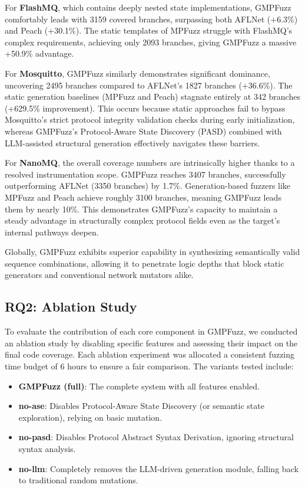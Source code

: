 For \textbf{FlashMQ}, which contains deeply nested state implementations, GMPFuzz comfortably leads with 3159 covered branches, surpassing both AFLNet (+6.3\%) and Peach (+30.1\%). The static templates of MPFuzz struggle with FlashMQ's complex requirements, achieving only 2093 branches, giving GMPFuzz a massive +50.9\% advantage.

For \textbf{Mosquitto}, GMPFuzz similarly demonstrates significant dominance, uncovering 2495 branches compared to AFLNet's 1827 branches (+36.6\%). The static generation baselines (MPFuzz and Peach) stagnate entirely at 342 branches (+629.5\% improvement). This occurs because static approaches fail to bypass Mosquitto's strict protocol integrity validation checks during early initialization, whereas GMPFuzz's Protocol-Aware State Discovery (PASD) combined with LLM-assisted structural generation effectively navigates these barriers.

For \textbf{NanoMQ}, the overall coverage numbers are intrinsically higher thanks to a resolved instrumentation scope. GMPFuzz reaches 3407 branches, successfully outperforming AFLNet (3350 branches) by 1.7\%. Generation-based fuzzers like MPFuzz and Peach achieve roughly 3100 branches, meaning GMPFuzz leads them by nearly 10\%. This demonstrates GMPFuzz's capacity to maintain a steady advantage in structurally complex protocol fields even as the target's internal pathways deepen.

Globally, GMPFuzz exhibits superior capability in synthesizing semantically valid sequence combinations, allowing it to penetrate logic depths that block static generators and conventional network mutators alike.




\subsection{RQ2: Ablation Study}
To evaluate the contribution of each core component in GMPFuzz, we conducted an ablation study by disabling specific features and assessing their impact on the final code coverage. Each ablation experiment was allocated a consistent fuzzing time budget of 6 hours to ensure a fair comparison. The variants tested include:
\begin{itemize}
    \item \textbf{GMPFuzz (full)}: The complete system with all features enabled.
    \item \textbf{no-ase}: Disables Protocol-Aware State Discovery (or semantic state exploration), relying on basic mutation.
    \item \textbf{no-pasd}: Disables Protocol Abstract Syntax Derivation, ignoring structural syntax analysis.
    \item \textbf{no-llm}: Completely removes the LLM-driven generation module, falling back to traditional random mutations.
\end{itemize}

